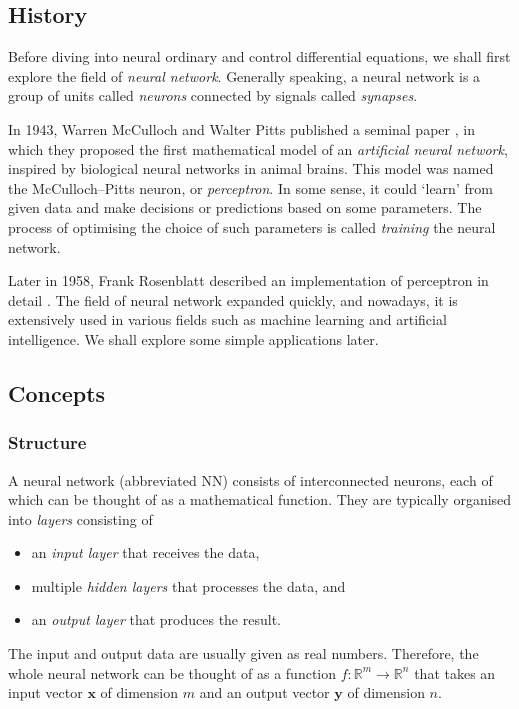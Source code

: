 \documentclass[a4paper,11pt, titlepage]{article}
\theoremstyle{definition}
\theoremstyle{plain}
\theoremstyle{remark}
\begin{document}
\subsection{History}

Before diving into neural ordinary and control differential equations, we shall first explore the field of \textit{neural network}. Generally speaking, a neural network is a group of units called \textit{neurons} connected by signals called \textit{synapses}.

In 1943, Warren McCulloch and Walter Pitts published a seminal paper \cite{McCulloch1943}, in which they proposed the first mathematical model of an \textit{artificial neural network}, inspired by biological neural networks in animal brains. This model was named the McCulloch–Pitts neuron, or \textit{perceptron}. In some sense, it could ‘learn’ from given data and make decisions or predictions based on some parameters. The process of optimising the choice of such parameters is called \textit{training} the neural network.

Later in 1958, Frank Rosenblatt described an implementation of perceptron in detail \cite{Rosenblatt1958}. The field of neural network expanded quickly, and nowadays, it is extensively used in various fields such as machine learning and artificial intelligence. We shall explore some simple applications later.

\subsection{Concepts}

\subsubsection{Structure}

A neural network (abbreviated NN) consists of interconnected neurons, each of which can be thought of as a mathematical function. They are typically organised into \textit{layers} consisting of

\begin{itemize}
    \item an \textit{input layer} that receives the data,
    \item multiple \textit{hidden layers} that processes the data, and
    \item an \textit{output layer} that produces the result.
\end{itemize}

The input and output data are usually given as real numbers. Therefore, the whole neural network can be thought of as a function $f:\mathbb{R}^m\rightarrow\mathbb{R}^n$ that takes an input vector $\mathbf{x}$ of dimension $m$ and an output vector $\mathbf{y}$ of dimension $n$.
\end{document}
